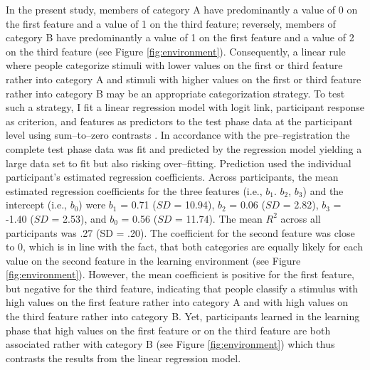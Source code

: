 \documentclass[a4paper,man,natbib]{apa6}
\begin{document}
In the present study, members of category A have predominantly a value of 0 on the first feature and a value of 1 on the third feature; reversely, members of category B have predominantly a value of 1 on the first feature and a value of 2 on the third feature (see Figure \ref{fig:environment}). Consequently, a linear rule where people categorize stimuli with lower values on the first or third feature rather into category A and stimuli with higher values on the first or third feature rather into category B may be an appropriate categorization strategy. To test such a strategy, I fit a linear regression model with logit link, participant response as criterion, and features as predictors to the test phase data at the participant level using sum--to--zero contrasts \citep{singmann2017introduction}. In accordance with the pre--registration the complete test phase data was fit and predicted by the regression model yielding a large data set to fit but also risking over--fitting. Prediction used the individual participant's estimated regression coefficients. Across participants, the mean estimated regression coefficients for the three features (i.e., $b_1$. $b_2$, $b_3$) and the intercept (i.e., $b_0$) were $b_1$ = 0.71 ($SD$ = 10.94), $b_2$ = 0.06 ($SD$ = 2.82), $b_3$ = -1.40 ($SD$ = 2.53), and $b_0$ = 0.56 ($SD$ = 11.74). The mean $R^2$ across all participants was .27 (SD = .20). 
The coefficient for the second feature was close to 0, which is in line with the fact, that both categories are equally likely for each value on the second feature in the learning environment (see Figure \ref{fig:environment}). However, the mean coefficient is positive for the first feature, but negative for the third feature, indicating that people classify a stimulus with high values on the first feature rather into category A and with high values on the third feature rather into category B. Yet, participants learned in the learning phase that high values on the first feature or on the third feature are both associated rather with category B (see Figure \ref{fig:environment}) which thus contrasts the results from the linear regression model.
\end{document}
